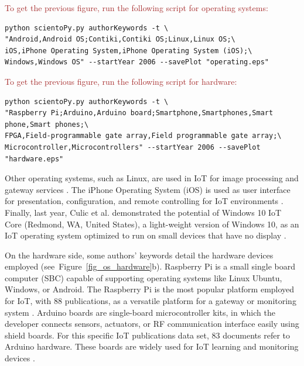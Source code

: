 \documentclass[symmetry,article,accept,moreauthors,pdftex10pt,a4paper]{mdpi}
\begin{document}
\noindent
\textcolor{brown}{To get the previous figure, run the following script for operating systems:}\\
\begin{verbatim}
python scientoPy.py authorKeywords -t \
"Android,Android OS;Contiki,Contiki OS;Linux,Linux OS;\
iOS,iPhone Operating System,iPhone Operating System (iOS);\
Windows,Windows OS" --startYear 2006 --savePlot "operating.eps"
\end{verbatim}

\noindent
\textcolor{brown}{To get the previous figure, run the following script for hardware:}\\
\begin{verbatim}
python scientoPy.py authorKeywords -t \
"Raspberry Pi;Arduino,Arduino board;Smartphone,Smartphones,Smart phone,Smart phones;\
FPGA,Field-programmable gate array,Field programmable gate array;\
Microcontroller,Microcontrollers" --startYear 2006 --savePlot "hardware.eps"
\end{verbatim}

Other operating systems, such as Linux, are used in IoT for image processing \cite{Dinesh2016} and gateway services \cite{Xu20164713}. The iPhone Operating System (iOS) is used as user interface for presentation, configuration, and remote controlling for IoT environments \cite{Kovalcik2016}. Finally, last year, Culic et al. demonstrated the potential of Windows 10 IoT Core (Redmond, WA, United States), a light-weight version of Windows 10, as an IoT operating system optimized to run on small devices that have no display \cite{7753246}.

On the hardware side, some authors' keywords detail the hardware devices employed (see~Figure~\ref{fig_os_hardware}b). Raspberry Pi is a small single board computer (SBC) capable of supporting operating systems like Linux Ubuntu, Windows, or Android. The Raspberry Pi is the most popular platform employed for IoT, with 88 publications, as a versatile platform for a gateway \cite{Suresh201517163,Kim20171533,Gloria2017568} or monitoring system \cite{7380571,Balasubramaniyan2016}. Arduino boards are single-board microcontroller kits, in which the developer connects sensors, actuators, or RF communication interface easily using shield boards. For this specific IoT publications data set, 83 documents refer to Arduino hardware. These boards are widely used for IoT learning \cite{Bogdanovic2014259,Raikar201715,Kovalcik2016} and monitoring devices \cite{Amin201543663,Fuertes201658,Ashwini20164311}. 
\end{document}
